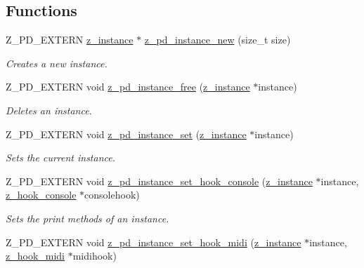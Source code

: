 \subsection*{Functions}
\begin{DoxyCompactItemize}
\item 
Z\-\_\-\-P\-D\-\_\-\-E\-X\-T\-E\-R\-N \hyperlink{struct__instance}{z\-\_\-instance} $\ast$ \hyperlink{group__zpd_gae40a58468cbf5714c5dc33e774448f07}{z\-\_\-pd\-\_\-instance\-\_\-new} (size\-\_\-t size)
\begin{DoxyCompactList}\small\item\em Creates a new instance. \end{DoxyCompactList}\item 
\hypertarget{group__zpd_ga0af646efcc6070f04fbb604312942326}{Z\-\_\-\-P\-D\-\_\-\-E\-X\-T\-E\-R\-N void \hyperlink{group__zpd_ga0af646efcc6070f04fbb604312942326}{z\-\_\-pd\-\_\-instance\-\_\-free} (\hyperlink{struct__instance}{z\-\_\-instance} $\ast$instance)}\label{group__zpd_ga0af646efcc6070f04fbb604312942326}

\begin{DoxyCompactList}\small\item\em Deletes an instance. \end{DoxyCompactList}\item 
\hypertarget{group__zpd_gadf17780d5492435d3a733d35f9a9d77b}{Z\-\_\-\-P\-D\-\_\-\-E\-X\-T\-E\-R\-N void \hyperlink{group__zpd_gadf17780d5492435d3a733d35f9a9d77b}{z\-\_\-pd\-\_\-instance\-\_\-set} (\hyperlink{struct__instance}{z\-\_\-instance} $\ast$instance)}\label{group__zpd_gadf17780d5492435d3a733d35f9a9d77b}

\begin{DoxyCompactList}\small\item\em Sets the current instance. \end{DoxyCompactList}\item 
\hypertarget{group__zpd_gac4e127ccbbf7bbac748f115b41ef4ead}{Z\-\_\-\-P\-D\-\_\-\-E\-X\-T\-E\-R\-N void \hyperlink{group__zpd_gac4e127ccbbf7bbac748f115b41ef4ead}{z\-\_\-pd\-\_\-instance\-\_\-set\-\_\-hook\-\_\-console} (\hyperlink{struct__instance}{z\-\_\-instance} $\ast$instance, \hyperlink{group__zpd_gab1e7283c4cbcb0f6576db1ac5238a112}{z\-\_\-hook\-\_\-console} $\ast$consolehook)}\label{group__zpd_gac4e127ccbbf7bbac748f115b41ef4ead}

\begin{DoxyCompactList}\small\item\em Sets the print methods of an instance. \end{DoxyCompactList}\item 
\hypertarget{group__zpd_ga2d9f7264e2264cbdee3be3f91d56c37a}{Z\-\_\-\-P\-D\-\_\-\-E\-X\-T\-E\-R\-N void \hyperlink{group__zpd_ga2d9f7264e2264cbdee3be3f91d56c37a}{z\-\_\-pd\-\_\-instance\-\_\-set\-\_\-hook\-\_\-midi} (\hyperlink{struct__instance}{z\-\_\-instance} $\ast$instance, \hyperlink{group__zpd_ga70728a8fec2c25d440e780c38205cba7}{z\-\_\-hook\-\_\-midi} $\ast$midihook)}\label{group__zpd_ga2d9f7264e2264cbdee3be3f91d56c37a}


\end{DoxyCompactItemize}
